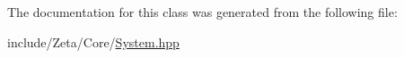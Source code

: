 The documentation for this class was generated from the following file\+:\begin{DoxyCompactItemize}
\item 
include/\+Zeta/\+Core/\hyperlink{System_8hpp}{System.\+hpp}\end{DoxyCompactItemize}
